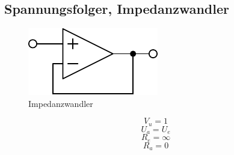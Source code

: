 



\subsection{Spannungsfolger, Impedanzwandler}
\begin{figure}[h!]
	\centering
	\includegraphics[scale=\schscale]{op_ufolg.pdf}
	\caption{Impedanzwandler}
	\label{sch:op-ufolg}
\end{figure}
\[ V_u = 1 \]
\[ U_a = U_e \]
\[ R_e = \infty \]
\[ R_a = 0 \]